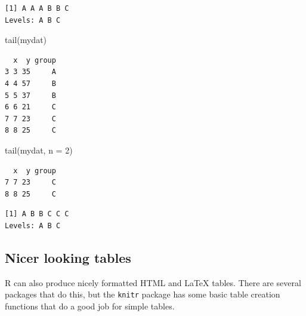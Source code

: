 \documentclass[
  letterpaper,
  DIV=11,
  numbers=noendperiod]{scrreprt}
\newenvironment{Shaded}{\begin{snugshade}}{\end{snugshade}}
\newcommand{\AttributeTok}[1]{\textcolor[rgb]{0.40,0.45,0.13}{#1}}
\newcommand{\DecValTok}[1]{\textcolor[rgb]{0.68,0.00,0.00}{#1}}
\newcommand{\FunctionTok}[1]{\textcolor[rgb]{0.28,0.35,0.67}{#1}}
\newcommand{\NormalTok}[1]{\textcolor[rgb]{0.00,0.23,0.31}{#1}}
\newcommand{\SpecialCharTok}[1]{\textcolor[rgb]{0.37,0.37,0.37}{#1}}
\begin{document}
\begin{Shaded}
\end{Shaded}

\begin{verbatim}
[1] A A A B B C
Levels: A B C
\end{verbatim}

\begin{Shaded}
\begin{Highlighting}[]
\FunctionTok{tail}\NormalTok{(mydat)}
\end{Highlighting}
\end{Shaded}

\begin{verbatim}
  x  y group
3 3 35     A
4 4 57     B
5 5 37     B
6 6 21     C
7 7 23     C
8 8 25     C
\end{verbatim}

\begin{Shaded}
\begin{Highlighting}[]
\FunctionTok{tail}\NormalTok{(mydat, }\AttributeTok{n =} \DecValTok{2}\NormalTok{)}
\end{Highlighting}
\end{Shaded}

\begin{verbatim}
  x  y group
7 7 23     C
8 8 25     C
\end{verbatim}

\begin{Shaded}
\end{Shaded}

\begin{verbatim}
[1] A B B C C C
Levels: A B C
\end{verbatim}

\hypertarget{nicer-looking-tables}{%
\subsection{Nicer looking tables}\label{nicer-looking-tables}}

R can also produce nicely formatted HTML and LaTeX tables. There are
several packages that do this, but the \texttt{knitr} package has some
basic table creation functions that do a good job for simple tables.
\end{document}
